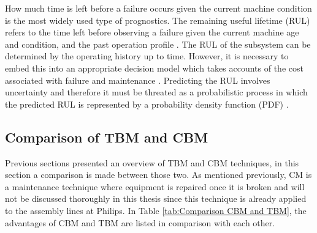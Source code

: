 How much time is left before a failure occurs given the current machine condition is the most widely used type of prognostics. The remaining useful lifetime (RUL) refers to the time left before observing a failure given the current machine age and condition, and the past operation profile \parencite{JARDINE2006}. The RUL of the subsystem can be determined by the operating history up to time. However, it is necessary to embed this into an appropriate decision model which takes accounts of the cost associated with failure and maintenance \parencite{SCARF1997}. Predicting the RUL involves uncertainty and therefore it must be threated as a probabilistic process in which the predicted RUL is represented by a probability density function (PDF) \parencite{Vogl2016}.

\subsection{Comparison of TBM and CBM} \label{Comparison of TBM and CBM}
Previous sections presented an overview of TBM and CBM techniques, in this section a comparison is made between those two. As mentioned previously, CM is a maintenance technique where equipment is repaired once it is broken and will not be discussed thoroughly in this thesis since this technique is already applied to the assembly lines at Philips. In Table \ref{tab:Comparison CBM and TBM}, the advantages of CBM and TBM are listed in comparison with each other.

